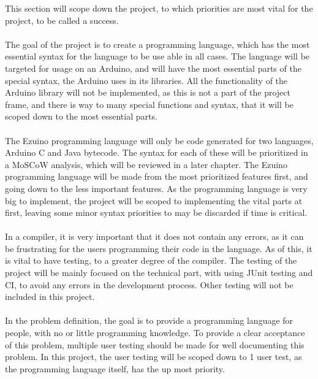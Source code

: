 This section will scope down the project, to which priorities are most vital for the project, to be called a success. \\
\\
The goal of the project is to create a programming language, which has the most essential syntax for the language to be use able in all cases. The language will be targeted for usage on an Arduino, and will have the most essential parts of the special syntax, the Arduino uses in its libraries. All the functionality of the Arduino library will not be implemented, as this is not a part of the project frame, and there is way to many special functions and syntax, that it will be scoped down to the most essential parts. \\
\\
The Ezuino programming language will only be code generated for two languages, Arduino C and Java bytecode. The syntax for each of these will be prioritized in a MoSCoW analysis, which will be reviewed in a later chapter. The Ezuino programming language will be made from the most prioritized features first, and going down to the less important features. As the programming language is very big to implement, the project will be scoped to implementing the vital parts at first, leaving some minor syntax priorities to may be discarded if time is critical. \\
\\
In a compiler, it is very important that it does not contain any errors, as it can be frustrating for the users programming their code in the language. As of this, it is vital to have testing, to a greater degree of the compiler. The testing of the project will be mainly focused on the technical part, with using JUnit testing and CI, to avoid any errors in the development process. Other testing will not be included in this project. \\
\\ 
In the problem definition, the goal is to provide a programming language for people, with no or little programming knowledge. To provide a clear acceptance of this problem, multiple user testing should be made for well documenting this problem. In this project, the user testing will be scoped down to 1 user test, as the programming language itself, has the up most priority.

